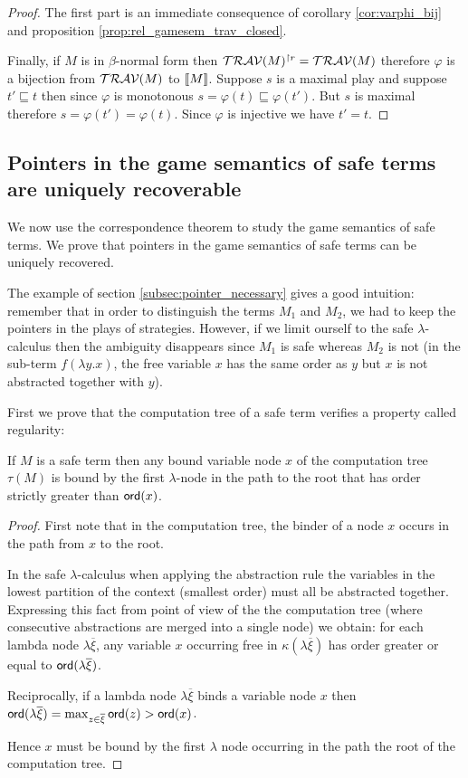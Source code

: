 \begin{proof}
The first part is an immediate consequence of corollary
\ref{cor:varphi_bij} and proposition
\ref{prop:rel_gamesem_trav_closed}.

Finally, if $M$ is in $\beta$-normal form then
$\mathcal{TRAV}(M)^{\upharpoonright r} = \mathcal{TRAV}(M)$
therefore $\varphi$ is a bijection from $\mathcal{TRAV}(M)$ to
${[\![ M ]\!]}$. Suppose $s$ is a maximal play and suppose $t' \sqsubseteq
t$ then since $\varphi$ is monotonous $s = \varphi(t) \sqsubseteq
\varphi(t')$. But $s$ is maximal therefore $s = \varphi(t') =
\varphi(t)$. Since $\varphi$ is injective we have $t'=t$.
\end{proof}




\subsection{Pointers in the game semantics of safe terms are uniquely recoverable}
We now use the correspondence theorem to study the game semantics of
safe terms. We prove that pointers in the game semantics of safe
terms can be uniquely recovered.

The example of section \ref{subsec:pointer_necessary} gives a good
intuition: remember that in order to distinguish the terms $M_1$ and
$M_2$, we had to keep the pointers in the plays of strategies.
However, if we limit ourself to the safe $\lambda$-calculus then the
ambiguity disappears since $M_1$ is safe whereas $M_2$ is not (in
the sub-term $f (\lambda y . x)$, the free variable $x$ has the same
order as $y$ but $x$ is not abstracted together with $y$).


First we prove that the computation tree of a safe term verifies a
property called regularity:
\begin{lem}
\label{lem:regularity}
If $M$ is a safe term then any bound variable node $x$ of the computation tree $\tau(M)$ is bound
by the first $\lambda$-node in the path to the root that has
order strictly greater than ${\sf ord}(x)$.
\end{lem}
\begin{proof}
First note that in the computation tree, the binder of a node $x$ occurs in the path from $x$ to the root.

In the safe $\lambda$-calculus when applying the abstraction rule the variables in the lowest partition of the context
(smallest order) must all be abstracted together. Expressing this fact from point of view of the the computation tree
(where consecutive abstractions are merged into a single node) we obtain:
for each lambda node $\lambda \overline{\xi}$, any variable $x$ occurring free in $\kappa(\lambda \overline{\xi})$
has order greater or equal to ${\sf ord}(\lambda \overline{\xi})$.

Reciprocally, if a lambda node $\lambda \overline{\xi}$ binds a variable node $x$ then ${\sf ord}(\lambda \overline{\xi}) = \max_{z\in\overline{\xi}} {\sf ord}(z) > {\sf ord}(x)$.

Hence $x$ must be bound by the first $\lambda$ node occurring in the path the root of the computation tree.
\end{proof}


